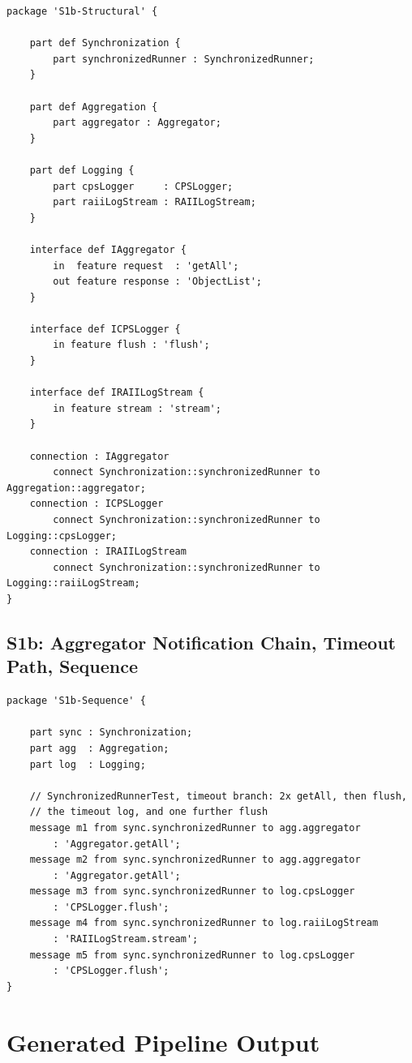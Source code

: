 \begin{verbatim}
package 'S1b-Structural' {

    part def Synchronization {
        part synchronizedRunner : SynchronizedRunner;
    }

    part def Aggregation {
        part aggregator : Aggregator;
    }

    part def Logging {
        part cpsLogger     : CPSLogger;
        part raiiLogStream : RAIILogStream;
    }

    interface def IAggregator {
        in  feature request  : 'getAll';
        out feature response : 'ObjectList';
    }

    interface def ICPSLogger {
        in feature flush : 'flush';
    }

    interface def IRAIILogStream {
        in feature stream : 'stream';
    }

    connection : IAggregator
        connect Synchronization::synchronizedRunner to Aggregation::aggregator;
    connection : ICPSLogger
        connect Synchronization::synchronizedRunner to Logging::cpsLogger;
    connection : IRAIILogStream
        connect Synchronization::synchronizedRunner to Logging::raiiLogStream;
}
\end{verbatim}

\subsection{S1b: Aggregator Notification Chain, Timeout Path, Sequence}

\begin{verbatim}
package 'S1b-Sequence' {

    part sync : Synchronization;
    part agg  : Aggregation;
    part log  : Logging;

    // SynchronizedRunnerTest, timeout branch: 2x getAll, then flush,
    // the timeout log, and one further flush
    message m1 from sync.synchronizedRunner to agg.aggregator
        : 'Aggregator.getAll';
    message m2 from sync.synchronizedRunner to agg.aggregator
        : 'Aggregator.getAll';
    message m3 from sync.synchronizedRunner to log.cpsLogger
        : 'CPSLogger.flush';
    message m4 from sync.synchronizedRunner to log.raiiLogStream
        : 'RAIILogStream.stream';
    message m5 from sync.synchronizedRunner to log.cpsLogger
        : 'CPSLogger.flush';
}
\end{verbatim}


\section{Generated Pipeline Output}
\label{sec:appendix-generated}

